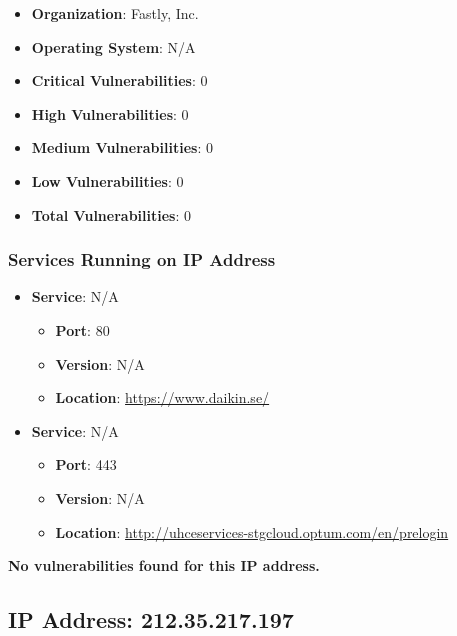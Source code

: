 \documentclass{article}
\begin{document}
\begin{itemize}
    \item \textbf{Organization}: Fastly, Inc.
    \item \textbf{Operating System}:  N/A 
    \item \textbf{Critical Vulnerabilities}: 0
    \item \textbf{High Vulnerabilities}: 0
    \item \textbf{Medium Vulnerabilities}: 0
    \item \textbf{Low Vulnerabilities}: 0
    \item \textbf{Total Vulnerabilities}: 0
\end{itemize}

\subsubsection*{Services Running on IP Address}

\begin{itemize}
    
        \item \textbf{Service}: N/A
        \begin{itemize}
            \item \textbf{Port}: 80
            \item \textbf{Version}:  N/A 
            \item \textbf{Location}: \href{ https://www.daikin.se/ }{ https://www.daikin.se/ }
        \end{itemize}
    
        \item \textbf{Service}: N/A
        \begin{itemize}
            \item \textbf{Port}: 443
            \item \textbf{Version}:  N/A 
            \item \textbf{Location}: \href{ http://uhceservices-stgcloud.optum.com/en/prelogin }{ http://uhceservices-stgcloud.optum.com/en/prelogin }
        \end{itemize}
    
\end{itemize}


\textbf{No vulnerabilities found for this IP address.}




\clearpage



\subsection*{IP Address: 212.35.217.197}
\end{document}
